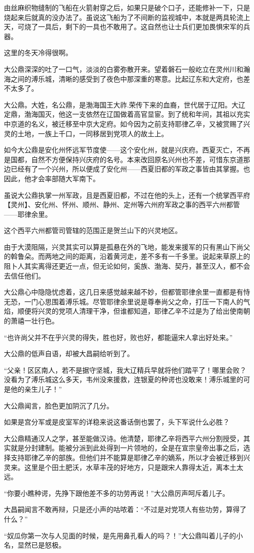 由丝麻织物缝制的飞船在火箭射穿之后，如果只是破个口子，还能修补一下，只是烧起来后就真的没办法了。虽说这飞船为了不间断的监视城中，本就是两具轮流上天，可烧了一具后，剩下的一具也不敢用了。这自然也让士兵们更加畏惧宋军的兵器。

这里的冬天冷得很啊。

大公鼎深深的吐了一口气，淡淡的白雾弥散开来。望着磐石一般屹立在灵州川和瀚海之间的溥乐城，清晰的感受到了夜色中那深重的寒意。比起辽东和大定府，也差不太多了。

大公鼎。大姓，名公鼎，是渤海国王大祚.荣传下来的血裔，世代居于辽阳。大辽定鼎，渤海国灭，他这一支依然在辽国做着高官显宦。到了统和年间，其祖以充实中京道的名义，被迁移至中京大定府。如今因为之前支持耶律乙辛，又被赏赐了兴灵的土地，一族上千口，一同移居到党项人的故土上。

如今大公鼎是安化州怀远军节度使——这个安化州，就是兴庆府。西夏灭亡，不再是国都，自然不方便保持兴庆府的名号。本来改回原名兴州也不差，可惜东京道那边已经有了一个兴州，所以便成了安化州——西夏旧都的军政之事皆由其掌握。也因此，他才会率部随大军南下。

虽说大公鼎执掌一州军政，且是西夏旧都，不过在他的头上，还有一个统掌西平府【灵州】、安化州、怀州、顺州、静州、定州等六州府军政之事的西平六州都管——耶律余里。

这个西平六州都管司管辖的范围正是贺兰山下的兴灵地区。

由于大漠阻隔，兴灵其实可以算是孤悬在外的飞地，能发来援军的只有黑山下尚父的斡鲁朵。而两地之间的距离，沿着黄河走，差不多有一千多里。说起来草原上的阻卜人其实离得还更近一点，但无论如何，奚族、渤海、契丹，甚至汉人，都不会去信任他们。

大公鼎心中隐隐忧虑着，这几日来感觉越来越不妙，但都管耶律余里一直都是有恃无恐，一门心思围着溥乐城。尽管耶律余里说是尊奉尚父之命，打压一下南人的气焰，顺便将兴灵的党项人清理干净，但谁都知道，耶律乙辛不过是为了给出使南朝的萧禧一壮行色。

“也许尚父并不在乎兴灵的得失，胜也好，败也好，都能逼宋人拿出好处来。”

大公鼎的低声自语，却被大昌嗣给听到了。

“父亲！区区南人，若不是据守坚城，我大辽精兵早就将他们踏平了！哪里会败？没看为了溥乐城这么多天，韦州没来援救，连银夏的种谔也没敢来！溥乐城里的可是他的亲生儿子！”

大公鼎闻言，脸色更加阴沉了几分。

如果是宫分军或是皮室军的详稳来说这番话倒也罢了，头下军说什么必胜？

大公鼎精通汉人之学，甚至能做汉诗。他清楚，耶律乙辛将西平六州分割授受，其实就是分封建制。能被分派到此处得到一片领地的，全是在宣宗皇帝出事之后，选择支持耶律乙辛的部族。但他们并不能算是耶律乙辛的嫡系，所以才会被迁移到兴灵来。这里是个田土肥沃，水草丰茂的好地方，只是跟宋人靠得太近，离本土太远。

“你要小瞧种谔，先挣下跟他差不多的功劳再说！”大公鼎厉声呵斥着儿子。

大昌嗣闻言不敢再辩，只是还小声的咕哝着：“不过是对党项人有些功劳，算得了什么？”

“奴瓜你第一次与人见面的时候，是先用鼻孔看人的吗？！”大公鼎叫着儿子的小名，显然已是怒极。

